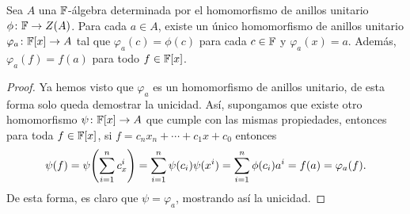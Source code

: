 \begin{prop}\label{prop:EvalPoly}
  Sea $A$ una $\mathbb{F}$-álgebra determinada por el homomorfismo de anillos unitario $\phi\colon \mathbb{F}\to Z(A)$. Para cada $a \in A$, existe un único homomorfismo de anillos unitario $\varphi_a \colon \mathbb{F}[x] \to A$ tal que $\varphi_a(c) = \phi(c)$ para cada $c \in \mathbb{F}$ y $\varphi_a(x) = a$. Además, $\varphi_a(f) = f(a)$ para todo $f \in \mathbb{F}[x]$.
\end{prop}
\begin{proof}
  Ya hemos visto que $\varphi_a$ es un homomorfismo de anillos unitario, de esta forma solo queda demostrar la unicidad. Así, supongamos que existe otro homomorfismo $\psi\colon \mathbb{F}[x] \to A$ que cumple con las mismas propiedades, entonces para toda $f \in \mathbb{F}[x]$, si $f = c_n x_n + \cdots+ c_1x + c_0$ entonces
  \[
    \psi(f) = \psi\paren{\sum_{i=1}^n c_x^i} = \sum_{i=1}^n \psi(c_i) \psi(x^i) = \sum_{i=1}^n \phi(c_i) a^i = f(a) = \varphi_a(f).
  \]
  De esta forma, es claro que $\psi = \varphi_a$, mostrando así la unicidad.
\end{proof}